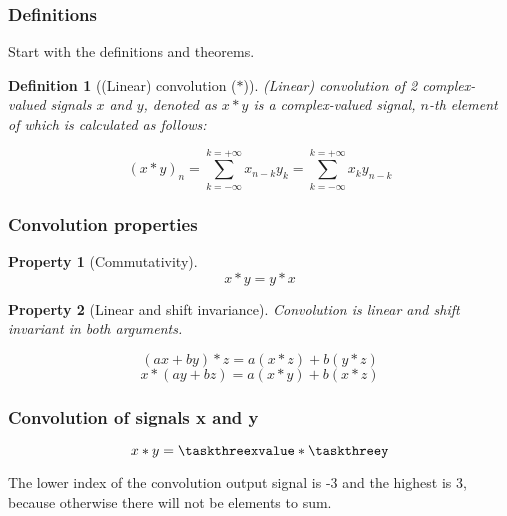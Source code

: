 \documentclass[a4paper]{article}
\theoremstyle{break}
\newtheorem{definition}{Definition}[section]
\theoremstyle{break}
\newtheorem{property}{Property}[section]
\begin{document}
\subsubsection*{Definitions}

Start with the definitions and theorems.

\begin{definition}[(Linear) convolution ($\ast$)]
  (Linear) convolution of 2 complex-valued signals $x$ and $y$, denoted as $x \ast y$ is a complex-valued signal, $n$-th element of which is calculated as follows:

  \begin{equation*}
    \left(x \ast y \right)_{n} = \sum_{k = -\infty} ^{k = +\infty} x_{n - k} y_k = \sum_{k = -\infty} ^{k = +\infty} x_k y_{n - k}
  \end{equation*}
\end{definition}

\subsubsection*{Convolution properties}

\begin{property}[Commutativity]
  \begin{equation*}
    x \ast y = y \ast x
  \end{equation*}
\end{property}

\begin{property}[Linear and shift invariance]
  Convolution is linear and shift invariant in both arguments.

  \begin{equation*}
    (a x + b y) \ast z = a (x \ast z) + b (y \ast z)
  \end{equation*}
  \begin{equation*}
    x \ast (a y + b z) = a (x \ast y) + b (x \ast z)
  \end{equation*}
\end{property}

\subsubsection*{Convolution of signals x and y}

\begin{equation*}
  x \ast y = \taskthreexvalue \ast \taskthreey
\end{equation*}

The lower index of the convolution output signal is -3 and the highest is 3, because otherwise there will not be elements to sum.
\end{document}
